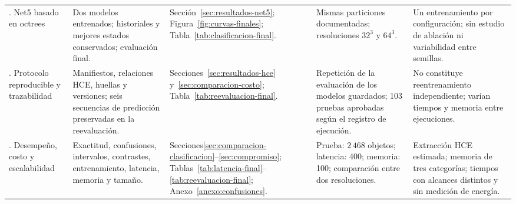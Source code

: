 \begin{longtable}{@{}>{\raggedright\arraybackslash}p{1.9cm}>{\raggedright\arraybackslash}p{3.05cm}>{\raggedright\arraybackslash}p{2.15cm}>{\raggedright\arraybackslash}p{2.9cm}>{\raggedright\arraybackslash}p{3.0cm}@{}}
3. Net5 basado en octrees & Dos modelos entrenados; historiales y mejores estados conservados; evaluación final. & Sección~\ref{sec:resultados-net5}; Figura~\ref{fig:curvas-finales}; Tabla~\ref{tab:clasificacion-final}. & Mismas particiones documentadas; resoluciones $32^3$ y $64^3$. & Un entrenamiento por configuración; sin estudio de ablación ni variabilidad entre semillas. \\ \addlinespace
4. Protocolo reproducible y trazabilidad & Manifiestos, relaciones HCE, huellas y versiones; seis secuencias de predicción preservadas en la reevaluación. & Secciones~\ref{sec:resultados-hce} y~\ref{sec:comparacion-costo}; Tabla~\ref{tab:reevaluacion-final}. & Repetición de la evaluación de los modelos guardados; 103 pruebas aprobadas según el registro de ejecución. & No constituye reentrenamiento independiente; varían tiempos y memoria entre ejecuciones. \\ \addlinespace
5. Desempeño, costo y escalabilidad & Exactitud, confusiones, intervalos, contrastes, entrenamiento, latencia, memoria y tamaño. & Secciones\newline\ref{sec:comparacion-clasificacion}--\ref{sec:compromiso}; Tablas~\ref{tab:latencia-final}--\ref{tab:reevaluacion-final}; Anexo~\ref{anexo:confusiones}. & Prueba: $2\,468$ objetos; latencia: 400; memoria: 100; comparación entre dos resoluciones. & Extracción HCE estimada; memoria de tres categorías; tiempos con alcances distintos y sin medición de energía. \\
\end{longtable}\endgroup

